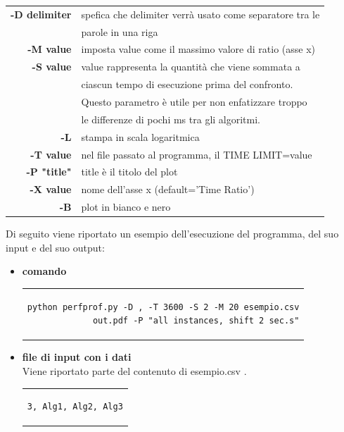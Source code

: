 \begin{center}
\begin{center}
\begin{table}[h]
\begin{tabular}{|r|l|}
\hline
\textbf{-D delimiter} & {spefica che delimiter verrà usato come separatore tra le}\\
& {parole in una riga}\\
\hline
\textbf{-M value} & {imposta value come il massimo valore di ratio (asse x)}\\
\hline
\textbf{-S value} & {value rappresenta la quantità che viene sommata a}\\
& {ciascun tempo di esecuzione prima del confronto.}\\
& {Questo parametro è utile per non enfatizzare troppo}\\
& {le differenze di pochi ms tra gli algoritmi.}\\
\hline
\textbf{-L} & {stampa in scala logaritmica}\\
\hline
\textbf{-T value} & {nel file passato al programma, il TIME LIMIT=value}\\
\hline
\textbf{-P "title"} & {title è il titolo del plot}\\
\hline
\textbf{-X value} & {nome dell'asse x (default='Time Ratio')}\\
\hline
\textbf{-B} & {plot in bianco e nero}\\
\hline
\end{tabular}
\end{table}
Di seguito viene riportato un esempio dell'esecuzione del programma, del suo input e del suo output:
\begin{itemize}
\item{\textbf{comando}
\begin{center}
\begin{tabular}{c}
\begin{lstlisting}[linewidth=330pt, basicstyle=\footnotesize\sffamily,] 
python perfprof.py -D , -T 3600 -S 2 -M 20 esempio.csv
             out.pdf -P "all instances, shift 2 sec.s"
\end{lstlisting}
\end{tabular}
\end{center}
}
\item{\textbf{file di input con i dati}\\
Viene riportato parte del contenuto di esempio.csv .
\begin{center}
\begin{tabular}{c}
\begin{lstlisting}[linewidth=240pt, basicstyle=\footnotesize\sffamily,] 
3, Alg1, Alg2, Alg3

\end{lstlisting}
\end{tabular}
\end{center}}
\end{itemize}
\end{center}
\end{center}
